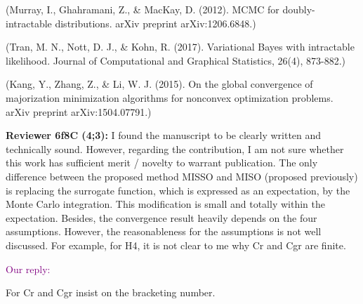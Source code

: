 \documentclass{article}
\begin{document}
(Murray, I., Ghahramani, Z., \& MacKay, D. (2012). MCMC for doubly-intractable distributions. arXiv preprint arXiv:1206.6848.) 

(Tran, M. N., Nott, D. J., \& Kohn, R. (2017). Variational Bayes with intractable likelihood. Journal of Computational and Graphical Statistics, 26(4), 873-882.)

(Kang, Y., Zhang, Z., \& Li, W. J. (2015). On the global convergence of majorization minimization algorithms for nonconvex optimization problems. arXiv preprint arXiv:1504.07791.) 

\textbf{Reviewer 6f8C (4;3):}
I found the manuscript to be clearly written and technically sound. However, regarding the contribution, I am not sure whether this work has sufficient merit / novelty to warrant publication. The only difference between the proposed method MISSO and MISO (proposed previously) is replacing the surrogate function, which is expressed as an expectation, by the Monte Carlo integration. This modification is small and totally within the expectation. Besides, the convergence result heavily depends on the four assumptions. However, the reasonableness for the assumptions is not well discussed. For example, for H4, it is not clear to me why Cr and Cgr are finite.

\textcolor{purple}{Our reply:}

For Cr and Cgr insist on the bracketing number.
\end{document}
